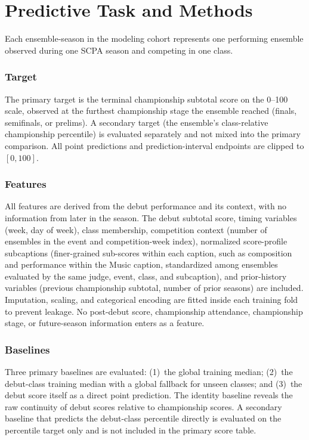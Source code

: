 \section{Predictive Task and Methods}
\label{sec:methods}

Each ensemble-season in the modeling cohort represents one performing ensemble
observed during one SCPA season and competing in one class.

\subsubsection*{Target} The primary target is the terminal championship subtotal
score on the 0--100 scale, observed at the furthest championship stage the
ensemble reached (finals, semifinals, or prelims). A secondary target (the
ensemble's class-relative championship percentile) is evaluated separately
and not mixed into the primary comparison. All point predictions and
prediction-interval endpoints are clipped to $[0, 100]$.

\subsubsection*{Features} All features are derived from the debut performance and
its context, with no information from later in the season. The debut subtotal
score, timing variables (week, day of week), class membership, competition
context (number of ensembles in the event and competition-week index),
normalized score-profile subcaptions (finer-grained sub-scores within each caption, such as composition and performance within the Music caption, standardized among ensembles evaluated
by the same judge, event, class, and subcaption), and prior-history variables
(previous championship subtotal, number of prior seasons) are included.
Imputation, scaling, and categorical encoding are fitted inside each training
fold to prevent leakage. No post-debut score, championship attendance,
championship stage, or future-season information enters as a feature.

\subsubsection*{Baselines} Three primary baselines are evaluated: (1)~the global
training median; (2)~the debut-class training median with a global fallback
for unseen classes; and (3)~the debut score itself as a direct point
prediction. The identity baseline reveals the raw continuity of debut scores
relative to championship scores. A secondary baseline that predicts the
debut-class percentile directly is evaluated on the percentile target only
and is not included in the primary score table.

